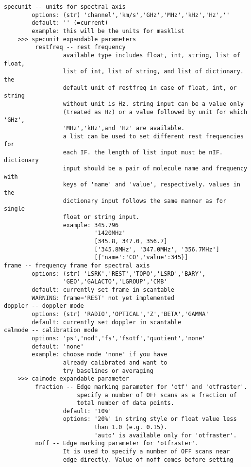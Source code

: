 \begin{verbatim}
specunit -- units for spectral axis
        options: (str) 'channel','km/s','GHz','MHz','kHz','Hz',''
        default: '' (=current)
        example: this will be the units for masklist
    >>> specunit expandable parameters
         restfreq -- rest frequency
                 available type includes float, int, string, list of float, 
                 list of int, list of string, and list of dictionary. the 
                 default unit of restfreq in case of float, int, or string 
                 without unit is Hz. string input can be a value only 
                 (treated as Hz) or a value followed by unit for which 'GHz',
                 'MHz','kHz',and 'Hz' are available. 
                 a list can be used to set different rest frequencies for 
                 each IF. the length of list input must be nIF. dictionary 
                 input should be a pair of molecule name and frequency with 
                 keys of 'name' and 'value', respectively. values in the 
                 dictionary input follows the same manner as for single 
                 float or string input. 
                 example: 345.796
                          '1420MHz'
                          [345.8, 347.0, 356.7]
                          ['345.8MHz', '347.0MHz', '356.7MHz']
                          [{'name':'CO','value':345}]
frame -- frequency frame for spectral axis
        options: (str) 'LSRK','REST','TOPO','LSRD','BARY',
                 'GEO','GALACTO','LGROUP','CMB'
        default: currently set frame in scantable
        WARNING: frame='REST' not yet implemented
doppler -- doppler mode
        options: (str) 'RADIO','OPTICAL','Z','BETA','GAMMA'
        default: currently set doppler in scantable
calmode -- calibration mode
        options: 'ps','nod','fs','fsotf','quotient','none'
        default: 'none'
        example: choose mode 'none' if you have
                 already calibrated and want to
                 try baselines or averaging
    >>> calmode expandable parameter
         fraction -- Edge marking parameter for 'otf' and 'otfraster'.
                     specify a number of OFF scans as a fraction of 
                     total number of data points. 
                 default: '10%'
                 options: '20%' in string style or float value less 
                          than 1.0 (e.g. 0.15).
                          'auto' is available only for 'otfraster'. 
         noff -- Edge marking parameter for 'otfraster'.
                 It is used to specify a number of OFF scans near 
                 edge directly. Value of noff comes before setting 

\end{verbatim}
